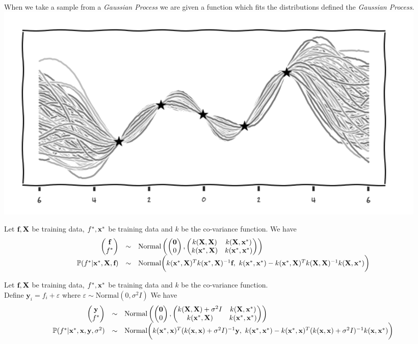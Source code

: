 \documentclass[11pt,a4paper]{article}
\begin{document}
When we take a sample from a \textit{Gaussian Process} we are given a function which fits the distributions defined the \textit{Gaussian Process}.\\

\includegraphics[scale=.7]{img/samplingGaussianProccess.png}

Let $\textbf{f},\textbf{X}$ be training data, $f^*,\textbf{x}^*$ be training data and $k$ be the co-variance function. We have %
\[\begin{array}{rcl}\begin{pmatrix}
\textbf{f}\\
f^*
\end{pmatrix}&\sim&\text{Normal}\left(\begin{pmatrix}
\textbf{0}\\
0
\end{pmatrix},\begin{pmatrix}
k(\X,\X)&k(\X,\x^*)\\
k(\x^*,\X)&k(\x^*,\x^*)
\end{pmatrix}\right)\\
\prob(f^*|\x^*,\X,\textbf{f})&\sim&\text{Normal}\bigg(k(\x^*,\X)^Tk(\x^*,\X)^{-1}\textbf{f},\ k(\x^*,\x^*)-k(\x^*,\X)^Tk(\X,\X)^{-1}k(\X,\x^*)\bigg)
\end{array}\]

Let $\textbf{f},\textbf{X}$ be training data, $f^*,\textbf{x}^*$ be training data and $k$ be the co-variance function.\\ Define $\textbf{y}_i=f_i+\varepsilon$ where $\varepsilon\sim\text{Normal}(0,\sigma^2I)$ We have %
\[\begin{array}{rcl}\begin{pmatrix}
\textbf{y}\\
f^*
\end{pmatrix}&\sim&\text{Normal}\left(\begin{pmatrix}
\textbf{0}\\
0
\end{pmatrix},\begin{pmatrix}
k(\X,\X)+\sigma^2I&k(\X,\x^*)\\
k(\x^*,\X)&k(\x^*,\x^*)
\end{pmatrix}\right)\\
\prob(f^*|\x^*,\x,\textbf{y},\sigma^2)&\sim&\text{Normal}\bigg(k(\x^*,\x)^T(k(\x,\x)+\sigma^2I)^{-1}\textbf{y},\ k(\x^*,\x^*)-k(\x^*,\x)^T(k(\x,\x)+\sigma^2I)^{-1}k(\x,\x^*)\bigg)
\end{array}\]
\end{document}
